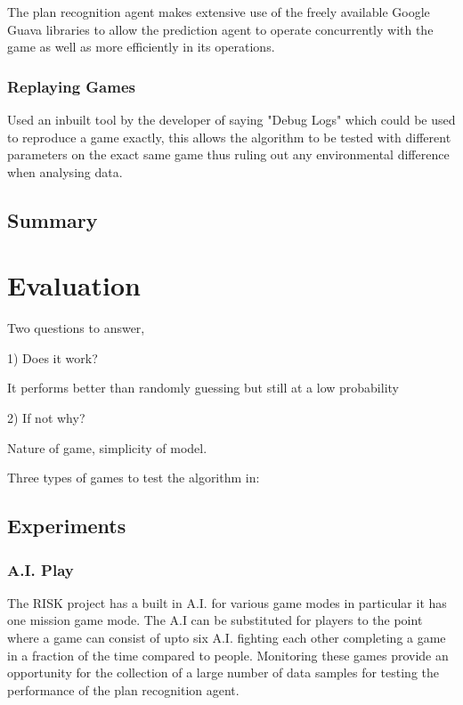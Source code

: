 \documentclass[parskip]{cs4rep}
\begin{document}
The plan recognition agent makes extensive use of the freely available Google Guava libraries to allow the prediction agent to operate concurrently with the game as well as more efficiently in its operations.

\subsection{Replaying Games}

Used an inbuilt tool by the developer of saying "Debug Logs" which could be used to reproduce a game exactly, this allows the algorithm to be tested with different parameters on the exact same game thus ruling out any environmental difference when analysing data.

\section{Summary}

\chapter{Evaluation}

Two questions to answer, 

1) Does it work?

It performs better than randomly guessing but still at a low probability

2) If not why?

Nature of game, simplicity of model.

Three types of games to test the algorithm in:

\section{Experiments}

\subsection{A.I. Play}

The RISK project has a built in A.I. for various game modes in particular it has one mission game mode. The A.I can be substituted for players to the point where a game can consist of upto six A.I. fighting each other completing a game in a fraction of the time compared to people. Monitoring these games provide an opportunity for the collection of a large number of data samples for testing the performance of the plan recognition agent.
\end{document}
